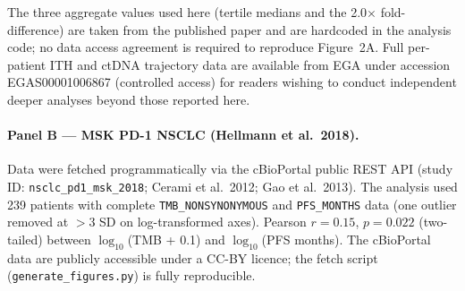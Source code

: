 \documentclass[12pt]{article}
\theoremstyle{remark}
\begin{document}
The three aggregate values used here (tertile medians and the 2.0$\times$ fold-difference) are taken from the published paper and are hardcoded in the analysis code; no data access agreement is required to reproduce Figure~2A. Full per-patient ITH and ctDNA trajectory data are available from EGA under accession EGAS00001006867 (controlled access) for readers wishing to conduct independent deeper analyses beyond those reported here.

\paragraph{Panel B --- MSK PD-1 NSCLC (Hellmann et al.\ 2018).}
Data were fetched programmatically via the cBioPortal public REST API (study ID: \texttt{nsclc\_pd1\_msk\_2018}; Cerami et al.\ 2012; Gao et al.\ 2013). The analysis used 239 patients with complete \texttt{TMB\_NONSYNONYMOUS} and \texttt{PFS\_MONTHS} data (one outlier removed at $>3$ SD on log-transformed axes). Pearson $r = 0.15$, $p = 0.022$ (two-tailed) between $\log_{10}$(TMB + 0.1) and $\log_{10}$(PFS months). The cBioPortal data are publicly accessible under a CC-BY licence; the fetch script (\texttt{generate\_figures.py}) is fully reproducible.
\end{document}
